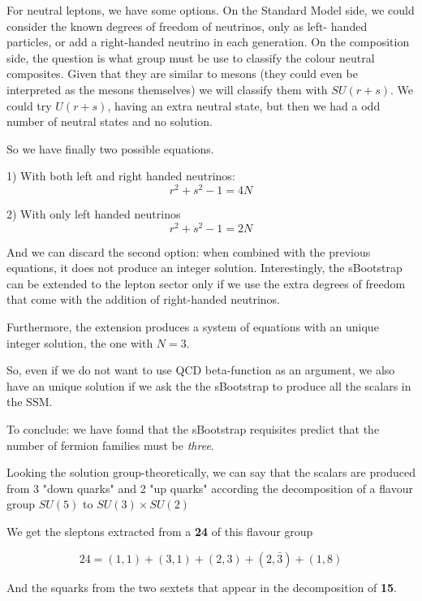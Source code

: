\documentclass[10pt]{article}
\begin{document}
For neutral leptons, we have some options.
On the Standard Model side, we could consider the
known degrees of freedom of neutrinos, only as left-
handed particles, or add a right-handed neutrino in
each generation.
On the composition side, the question is what group
must be use to classify the colour neutral composites. 
Given that
they are similar to mesons (they could even be interpreted
as the mesons themselves) we will classify
them with $SU(r+s)$. We could try $U(r+s)$, having
an extra neutral state, but then we had a odd number
of neutral states and no solution.

So we have finally two possible equations.

1) With both left and right handed neutrinos:
\begin{equation}
r^2 + s^2 -1 = 4N
\end{equation}


2) With only left handed neutrinos
\begin{equation}
r^2 + s^2 -1 = 2N
\end{equation}

And we can discard the second option: when combined with
the previous equations, it does not produce an
integer solution. Interestingly, the sBootstrap can be extended to
the lepton sector only if we use the extra degrees
of freedom that come with the addition of right-handed
neutrinos.

Furthermore, the extension produces a system of
equations with an unique integer solution,
the one with $N=3$.

So, even if we do not want to use QCD beta-function
as an argument, we also have an unique solution if
we ask the the sBootstrap to produce all the scalars
in the SSM. 

To conclude: we
have found that the sBootstrap requisites predict
that the number of fermion families must be \emph{three}.

Looking the solution group-theoretically, we can say that
the scalars are produced from 3 "down quarks" and 2 "up quarks"
according the decomposition of a flavour group 
$SU(5)$ to $SU(3) \times SU(2)$

We get the sleptons extracted from a {\bf 24} of this
flavour group

\begin{equation}
 24=(1,1)+(3,1)+(2,3)+(2, \bar 3)+(1,8)
\end{equation}

And the squarks from the two
sextets that appear in the
decomposition of {\bf 15}.
\end{document}
